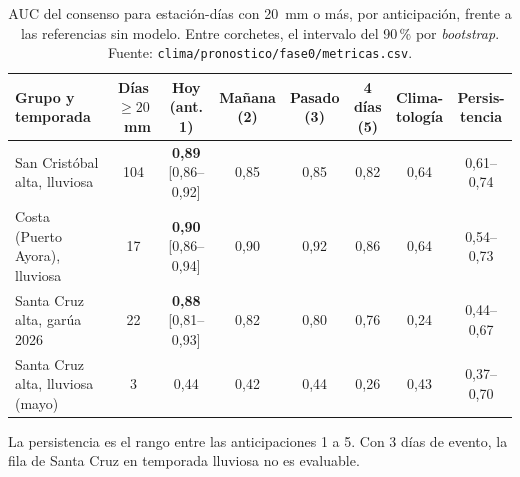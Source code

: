 \documentclass{sosg-informe}
\begin{document}
\begin{table}[ht]
  \centering\small
  \caption{AUC del consenso para estación-días con 20~mm o más, por anticipación, frente a las referencias sin modelo. Entre corchetes, el intervalo del 90\,\% por \emph{bootstrap}. Fuente: \texttt{clima/pronostico/fase0/metricas.csv}.}
  \label{tab:auc}
  \begin{tabularx}{\linewidth}{>{\raggedright\arraybackslash}Xccccccc}
    \toprule
    Grupo y temporada & \makecell{Días\\$\geq 20$~mm} & \makecell{Hoy\\(ant. 1)} & \makecell{Mañana\\(2)} & \makecell{Pasado\\(3)} & \makecell{4 días\\(5)} & \makecell{Clima-\\tología} & \makecell{Persis-\\tencia} \\
    \midrule
    San Cristóbal alta, lluviosa & 104 & \makecell{\textbf{0,89}\\{[}0,86--0,92{]}} & 0,85 & 0,85 & 0,82 & 0,64 & 0,61--0,74 \\
    Costa (Puerto Ayora), lluviosa & 17 & \makecell{\textbf{0,90}\\{[}0,86--0,94{]}} & 0,90 & 0,92 & 0,86 & 0,64 & 0,54--0,73 \\
    Santa Cruz alta, garúa 2026 & 22 & \makecell{\textbf{0,88}\\{[}0,81--0,93{]}} & 0,82 & 0,80 & 0,76 & 0,24 & 0,44--0,67 \\
    Santa Cruz alta, lluviosa (mayo) & 3 & 0,44 & 0,42 & 0,44 & 0,26 & 0,43 & 0,37--0,70 \\
    \bottomrule
  \end{tabularx}
  \par\vspace{3pt}\raggedright\footnotesize La persistencia es el rango entre las anticipaciones 1 a 5. Con 3 días de evento, la fila de Santa Cruz en temporada lluviosa no es evaluable.
\end{table}
\end{document}
